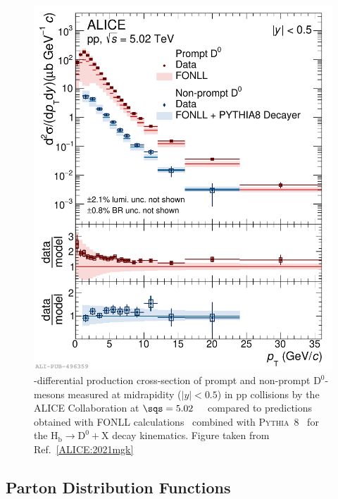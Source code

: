 \begin{figure}[htb]
    \centering
    \includegraphics[width=0.6\linewidth]{Figures/Chapter 2/CrossSectionD0_Prompt_NonPrompt_pp5TeV_vsFONLL_Pythia8_BRnative_1.pdf}
    \caption{\pt-differential production cross-section of prompt and non-prompt $\mathrm{D^0}$-mesons measured at midrapidity ($\lvert y\rvert<0.5$) in pp collisions by the ALICE Collaboration at $\sqs=5.02$~\tev~\cite{ALICE:2021mgk} compared to predictions obtained with FONLL calculations~\cite{Cacciari:1998it} combined with \textsc{Pythia}~8~\cite{Sjostrand:2014zea} for the $\mathrm{H_b \rightarrow D^0+X}$ decay kinematics. Figure taken from Ref.~\ref{ALICE:2021mgk}}
    \label{fig:ppDmeson}
\end{figure}

\subsection{Parton Distribution Functions}
